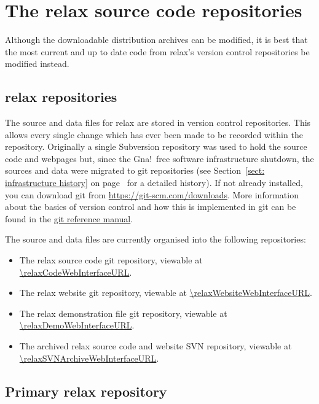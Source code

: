 
\section{The relax source code repositories} \label{git repository}

Although the downloadable distribution archives can be modified, it is best that the most current and up to date code from relax's version control repositories be modified instead.


\subsection{relax repositories}

The source and data files for relax are stored in version control repositories.
This allows every single change which has ever been made to be recorded within the repository.
Originally a single Subversion repository was used to hold the source code and webpages but, since the Gna!\ free software infrastructure shutdown, the sources and data were migrated to git repositories (see Section~\ref{sect: infrastructure history} on page~\pageref{sect: infrastructure history} for a detailed history).
If not already installed, you can download git from \url{https://git-scm.com/downloads}.
More information about the basics of version control and how this is implemented in git can be found in the \href{https://git-scm.com/docs}{git reference manual}.

The source and data files are currently organised into the following repositories:
\begin{itemize}
    \item The relax source code git repository, viewable at \url{\relaxCodeWebInterfaceURL}.
    \item The relax website git repository, viewable at \url{\relaxWebsiteWebInterfaceURL}.
    \item The relax demonstration file git repository, viewable at \url{\relaxDemoWebInterfaceURL}.
    \item The archived relax source code and website SVN repository, viewable at \url{\relaxSVNArchiveWebInterfaceURL}.
\end{itemize}


\subsection{Primary relax repository}

